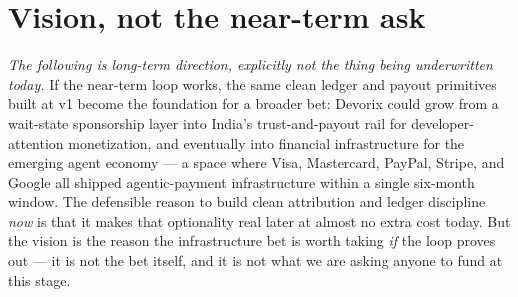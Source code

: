 \section*{Vision, not the near-term ask}

\emph{The following is long-term direction, explicitly not the thing being
underwritten today.} If the near-term loop works, the same clean ledger and
payout primitives built at v1 become the foundation for a broader bet:
Devorix could grow from a wait-state sponsorship layer into India's
trust-and-payout rail for developer-attention monetization, and eventually
into financial infrastructure for the emerging agent economy --- a space where
Visa, Mastercard, PayPal, Stripe, and Google all shipped agentic-payment
infrastructure within a single six-month window. The defensible reason to
build clean attribution and ledger discipline \emph{now} is that it makes that
optionality real later at almost no extra cost today. But the vision is the
reason the infrastructure bet is worth taking \emph{if} the loop proves out
--- it is not the bet itself, and it is not what we are asking anyone to fund
at this stage.
